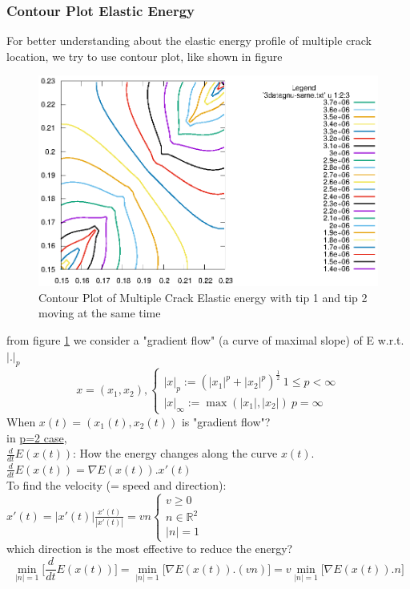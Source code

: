 \documentclass[a4paper,11pt]{article}
\newcommand{\R}{\mathbb{R}}
\begin{document}
\subsubsection{Contour Plot Elastic Energy}
For better understanding about the elastic energy profile of multiple crack location, we try to use contour plot, like shown in figure
\begin{figure}[h!]
	\centering
	\includegraphics[width=0.7\linewidth]{picture/conference/elasticdouble-same}
	\caption{Contour Plot of Multiple Crack Elastic energy with tip 1 and tip 2 moving at the same time}
	\label{fig:elasticdouble-same}
\end{figure}
from figure \ref{fig:elasticdouble-same} we consider a "gradient flow" (a curve of maximal slope) of E w.r.t. $|.|_p$
\begin{equation}
x = (x_1,x_2), \begin{cases}
|x|_p := (|x_1|^p + |x_2|^p)^{\frac{1}{2}}\ 1\leq p < \infty\\
|x|_\infty := \max(|x_1|,|x_2|)\ p=\infty
\end{cases}
\end{equation}
When $x(t) = (x_1(t), x_2(t))$ is "gradient flow"?\\
in \underline{p=2 case},\\
$\frac{d}{dt}E(x(t))$: How the energy changes along the curve $x(t)$.\\
$\frac{d}{dt}E(x(t)) = \nabla E(x(t)).x'(t)$\\
To find the velocity (= speed and direction): $x'(t) = |x'(t)|\frac{x'(t)}{|x'(t)|} = vn \begin{cases}
v\geq 0 \\
n \in \R^2 \\
|n| = 1
\end{cases}$\\
which direction is the most effective to reduce the energy?\\
\begin{equation}\label{emin}
\min_{|n|=1}\bigg[\frac{d}{dt} E(x(t))\bigg] = \min_{|n|=1}\big[\nabla E(x(t)).(vn)\big] = v \min_{|n|=1}\big[\nabla E(x(t)).n\big]
\end{equation}
\end{document}
